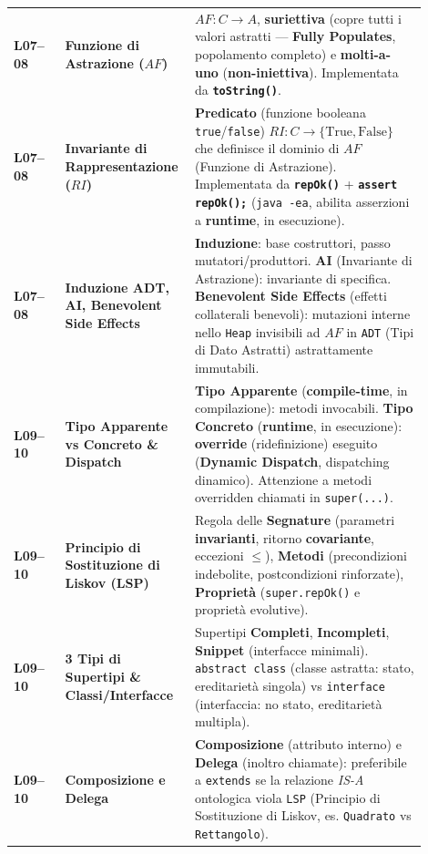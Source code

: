 \begin{longtable}{>{\raggedright\arraybackslash}p{0.12\linewidth}>{\raggedright\arraybackslash}p{0.24\linewidth}>{\raggedright\arraybackslash}p{0.54\linewidth}}
\textbf{L07–08} & \textbf{Funzione di Astrazione ($AF$)} & $AF : C \to A$, \textbf{suriettiva} (copre tutti i valori astratti — \textbf{Fully Populates}, popolamento completo) e \textbf{molti-a-uno} (\textbf{non-iniettiva}). Implementata da \textbf{\texttt{toString()}}. \\

\textbf{L07–08} & \textbf{Invariante di Rappresentazione ($RI$)} & \textbf{Predicato} (funzione booleana \texttt{true}/\texttt{false}) $RI : C \to \{\text{True}, \text{False}\}$ che definisce il dominio di $AF$ (Funzione di Astrazione). Implementata da \textbf{\texttt{repOk()}} + \textbf{\texttt{assert repOk();}} (\texttt{java -ea}, abilita asserzioni a \textbf{runtime}, in esecuzione). \\

\textbf{L07–08} & \textbf{Induzione ADT, AI, Benevolent Side Effects} & \textbf{Induzione}: base costruttori, passo mutatori/produttori. \textbf{AI} (Invariante di Astrazione): invariante di specifica. \textbf{Benevolent Side Effects} (effetti collaterali benevoli): mutazioni interne nello \texttt{Heap} invisibili ad $AF$ in \texttt{ADT} (Tipi di Dato Astratti) astrattamente immutabili. \\

\textbf{L09–10} & \textbf{Tipo Apparente vs Concreto \& Dispatch} & \textbf{Tipo Apparente} (\textbf{compile-time}, in compilazione): metodi invocabili. \textbf{Tipo Concreto} (\textbf{runtime}, in esecuzione): \textbf{override} (ridefinizione) eseguito (\textbf{Dynamic Dispatch}, dispatching dinamico). Attenzione a metodi overridden chiamati in \texttt{super(...)}. \\

\textbf{L09–10} & \textbf{Principio di Sostituzione di Liskov (LSP)} & Regola delle \textbf{Segnature} (parametri \textbf{invarianti}, ritorno \textbf{covariante}, eccezioni $\le$), \textbf{Metodi} (precondizioni indebolite, postcondizioni rinforzate), \textbf{Proprietà} (\texttt{super.repOk()} e proprietà evolutive). \\

\textbf{L09–10} & \textbf{3 Tipi di Supertipi \& Classi/Interfacce} & Supertipi \textbf{Completi}, \textbf{Incompleti}, \textbf{Snippet} (interfacce minimali). \texttt{abstract class} (classe astratta: stato, ereditarietà singola) vs \texttt{interface} (interfaccia: no stato, ereditarietà multipla). \\

\textbf{L09–10} & \textbf{Composizione e Delega} & \textbf{Composizione} (attributo interno) e \textbf{Delega} (inoltro chiamate): preferibile a \texttt{extends} se la relazione \emph{IS-A} ontologica viola \texttt{LSP} (Principio di Sostituzione di Liskov, es. \texttt{Quadrato} vs \texttt{Rettangolo}). \\


\end{longtable}
